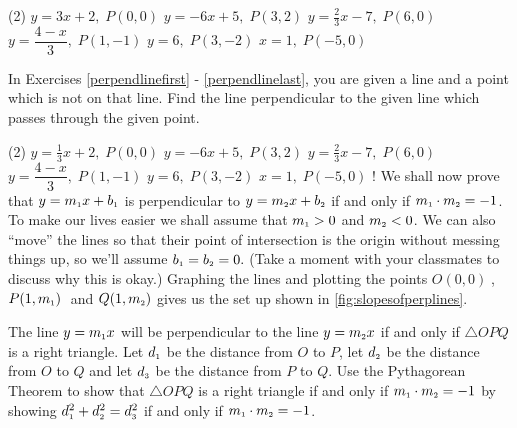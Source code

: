 \begin{tasks}[resume](2)
\task $y = 3x + 2, \; P(0, 0)$ \label{parallelfirst}
\task $y = -6x + 5, \; P(3, 2)$
\task $y = \frac{2}{3} x - 7, \; P(6, 0)$
\task $y = \dfrac{4-x}{3}, \; P(1, -1)$
\task $y = 6, \; P(3, -2)$
\task $x=1, \; P(-5,0)$ \label{parallellast}
\end{tasks}

\label{perpendicularlines}

In Exercises \ref{perpendlinefirst} - \ref{perpendlinelast}, you are given a line and a point which is not on that line.  Find the line perpendicular to the given line which passes through the given point.

\begin{tasks}[resume](2)
\task $y = \frac{1}{3}x + 2, \; P(0, 0)$ \label{perpendlinefirst}
\task $y = -6x + 5, \; P(3, 2)$
\task $y = \frac{2}{3} x - 7, \; P(6, 0)$
\task $y = \dfrac{4-x}{3}, \; P(1, -1)$
\task $y = 6, \; P(3, -2)$
\task $x=1, \; P(-5,0)$ \label{perpendlinelast}
\task! We shall now prove that $y = m_{\mbox{\tiny$1$}}x + b_{\mbox{\tiny$1$}}$ is perpendicular to $y = m_{\mbox{\tiny$2$}}x + b_{\mbox{\tiny$2$}}$ if and only if $m_{\mbox{\tiny$1$}} \cdot m_{\mbox{\tiny$2$}} = -1$.  To make our lives easier we shall assume that $m_{\mbox{\tiny$1$}} > 0$ and $m_{\mbox{\tiny$2$}} < 0$.  We can also ``move'' the lines so that their point of intersection is the origin without messing things up, so we'll assume $b_{\mbox{\tiny$1$}} = b_{\mbox{\tiny$2$}} = 0.$  (Take a moment with your classmates to discuss why this is okay.)  Graphing the lines and plotting the points $O(0, 0)\;$, $P(1, m_{\mbox{\tiny$1$}})\;$ and $Q(1, m_{\mbox{\tiny$2$}})$ gives us the set up shown in \autoref{fig:slopesofperplines}. \label{perpendicularlineproof}

The line $y = m_{\mbox{\tiny$1$}}x$ will be perpendicular to the line $y = m_{\mbox{\tiny$2$}}x$ if and only if $\bigtriangleup OPQ$ is a right triangle.  Let $d_{\mbox{\tiny$1$}}$ be the distance from $O$ to $P$, let $d_{\mbox{\tiny$2$}}$ be the distance from $O$ to $Q$ and let $d_{\mbox{\tiny$3$}}$ be the distance from $P$ to $Q$.  Use the Pythagorean Theorem to show that $\bigtriangleup OPQ$ is a right triangle if and only if $m_{\mbox{\tiny$1$}} \cdot m_{\mbox{\tiny$2$}} = -1$ by showing $d_{\mbox{\tiny$1$}}^{2} + d_{\mbox{\tiny$2$}}^{2} = d_{\mbox{\tiny$3$}}^2$ if and only if $m_{\mbox{\tiny$1$}} \cdot m_{\mbox{\tiny$2$}} = -1$.  

\end{tasks}

